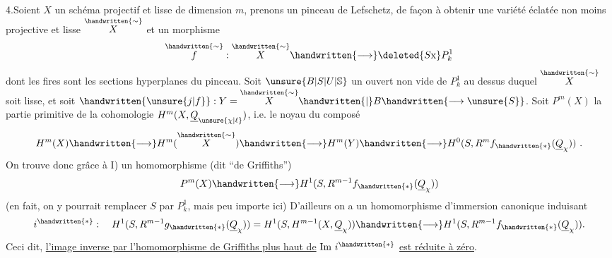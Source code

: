4.\quad Soient $X$ un schéma projectif et lisse de dimension $m$, prenons un pinceau de Lefschetz, de façon à obtenir une variété éclatée non moins projective et lisse $\overset{\handwritten{\sim}}{X}$ et un morphisme
\[
\overset{\handwritten{\sim}}{f}:\overset{\handwritten{\sim}}{X}\handwritten{\longrightarrow}\deleted{S\mathrm{x}}P^1_k
\]
dont les fires sont les sections hyperplanes du pinceau. Soit $\unsure{B|S|U|\mathbb{S}}$ un ouvert non vide de $P^1_k$ au dessus duquel $\overset{\handwritten{\sim}}{X}$ soit lisse, et soit $\handwritten{\unsure{j|f}}:Y=\overset{\handwritten{\sim}}{X}\handwritten{|}B\handwritten{\longrightarrow\unsure{S}}$.
Soit $P^m(X)$ la partie primitive de la cohomologie $H^m(X,\underline{Q}_{\unsure{\chi|\ell}})$, i.e. le noyau du composé
\[
H^m(X)\handwritten{\longrightarrow}H^m(\overset{\handwritten{\sim}}{X})\handwritten{\longrightarrow}H^m(Y)\handwritten{\longrightarrow}H^0(S,R^m f_{\handwritten{*}}(\underline{Q}_{\chi}))\ .
\]
On trouve donc grâce à I) un homomorphisme (dit ``de Griffiths'')
\[
P^m(X)\handwritten{\longrightarrow}H^1(S,R^{m-1}f_{\handwritten{*}}(\underline{Q}_{\chi}))
\]
(en fait, on y pourrait remplacer $S$ par $P^1_k$, mais  peu importe ici)
D'ailleurs  on a un homomorphisme d'immersion canonique
induisant
\[
i^{\handwritten{*}}:\quad H^1(S,R^{m-1}g_{\handwritten{*}}(\underline{Q}_{\chi}))=H^1(S,H^{m-1}(X,\underline{Q}_{\chi}))\handwritten{\longrightarrow}H^1(S,R^{m-1}f_{\handwritten{*}}(\underline{Q}_{\chi})).
\]
Ceci dit, \uline{l'image inverse par l'homomorphisme de Griffiths plus haut de} $\mathrm{Im}\ i^{\handwritten{*}}$ \uline{est réduite à zéro}.

